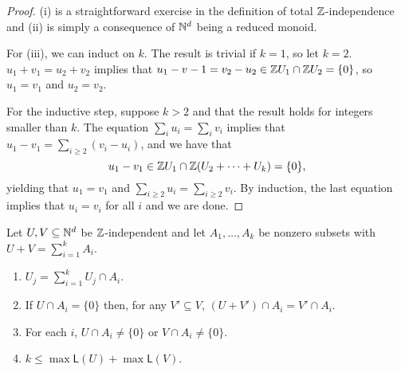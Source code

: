 \begin{proof}
(i) is a straightforward exercise in the definition of total $\mathbb{Z}$-independence and (ii) is simply a consequence of $\mathbb{N}^d$ being a reduced monoid.

For (iii), we can induct on $k$.
The result is trivial if $k = 1$, so let $k=2$.
$u_1 + v_1 = u_2 + v_2$ implies that $u_1 - v-1 = v_2 - u_2 \in \mathbb{Z} U_1 \cap \mathbb{Z} U_2 = \{0\}$, so $u_1 = v_1$ and $u_2 = v_2$.

For the inductive step, suppose $k>2$ and that the result holds for integers smaller than $k$.
The equation $\sum_i u_i = \sum_i v_i$ implies that $u_1 - v_1 = \sum_{i\ge 2} (v_i - u_i)$, and we have that 
\[u_1 - v_1 \in \mathbb{Z} U_1 \cap \mathbb{Z}(U_2+\cdots+U_k) = \{0\},\]
yielding that $u_1 = v_1$ and $\sum_{i\ge 2} u_i = \sum_{i\ge 2} v_i$.
By induction, the last equation implies that $u_i = v_i$ for all $i$ and we are done.
\end{proof}

\begin{prop} \label{prop:indep-decomp}
Let $U,V \subseteq \mathbb{N}^d$ be $\mathbb{Z}$-independent and let $A_1,\dots, A_k$ be nonzero subsets with $U+V = \sum_{i=1}^k A_i$.
\begin{enumerate}[label={\rm (\roman{*})}]
	\item $U_j = \sum_{i=1}^k U_j\cap A_i$.
	\item If $U \cap A_i = \{0\}$ then, for any $V'\subseteq V$, $(U+V')\cap A_i = V'\cap A_i$.
	\item For each $i$, $U\cap A_i \neq \{0\}$ or $V \cap A_i \neq \{0\}$.
	\item $k \le \max \mathsf{L}(U) + \max \mathsf{L}(V)$.
\end{enumerate}
\end{prop}

